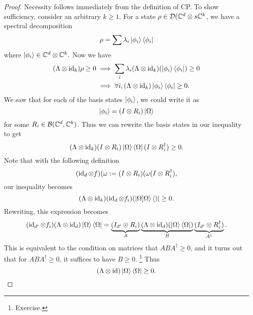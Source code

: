 \begin{proof}
    Necessity follows immediately from the definition of CP. To show sufficiency, consider an arbitrary $k\geq 1$. For a state $\rho \in \mathcal{D}(\mathbb{C}^d \otimes s\mathbb{C}^k$, we have a spectral decomposition
    \begin{equation}
        \rho =\sum \lambda_i \left| \phi_i \right>\left< \phi_i \right|
    \end{equation}
    where $\left| \phi_i \right>\in \mathbb{C}^d \otimes \mathbb{C}^k.$
    Now we have
    \begin{align}
        (\Lambda \otimes \text{id}_k)\rho \geq 0 &\implies \sum_i \lambda_i(\Lambda \otimes \operatorname{id}_k)(\left| \phi_i \right>\left< \phi_i \right|)\geq 0\\
        &\implies \forall i, (\Lambda \otimes \operatorname{id}_k)\left| \phi_i \right>\left< \phi_i \right| \geq 0.
    \end{align}
    We saw that for each of the basis states $\left| \phi_i \right>$, we could write it as
    \begin{equation}
        \left| \phi_i \right>=(I\otimes R_i)\left| \Omega \right>
    \end{equation}
    for some $R_i\in \mathcal{B}(\mathbb{C}^d, \mathbb{C}^k)$. Thus we can rewrite the basis states in our inequality to get
    \begin{equation}
        (\Lambda \otimes \operatorname{id}_k)(I\otimes R_i)\left| \Omega \right>\left< \Omega \right| (I\otimes R_i^\dagger)\geq 0.
    \end{equation}
    Note that with the following definition
    \begin{equation}
        (\operatorname{id}_d \otimes f)(\omega := (I\otimes R_i)(\omega(I\otimes R_i^\dagger),
    \end{equation}
    our inequality becomes
    \begin{equation}
        (\Lambda \otimes \operatorname{id}_k)(\operatorname{id}_d \otimes f_i)(\left| \Omega]{\Omega} \right>\left< ) \right| \geq 0.
    \end{equation}
    Rewriting, this expression becomes
    \begin{equation}
        (\operatorname{id}_{d'}\otimes f_i)(\Lambda \otimes \operatorname{id}_d)\left| \Omega \right>\left< \Omega \right| = \underbrace{(I_{d'}\otimes R_i)}_A\underbrace{(\Lambda \otimes \operatorname{id}_d)(\left| \Omega \right>\left< \Omega \right|)}_{B}\underbrace{(I_{d'}\otimes R_i^\dagger)}_{A^\dagger}.
    \end{equation}
    This is equivalent to the condition on matrices that $ABA^\dagger \geq 0$, and it turns out that for $ABA^\dagger \geq 0$, it suffices to have $B\geq 0$.%
        \footnote{Exercise.}
    Thus
    \begin{equation}
        (\Lambda \otimes \operatorname{id})\left| \Omega \right>\left< \Omega \right| \geq 0. \qedhere
    \end{equation}
\end{proof}

